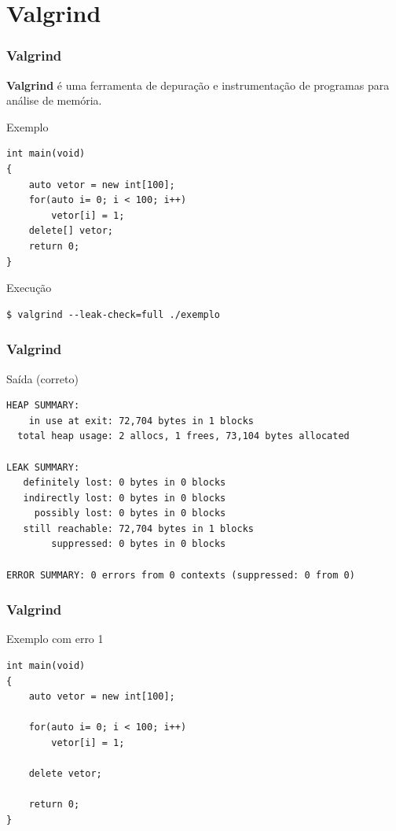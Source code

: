\documentclass[xcolor={usenames,dvipsnames},12pt,presentation,aspectratio=169]{beamer}
\begin{document}
\section{Valgrind}
\begin{frame}[fragile]
  \frametitle{Valgrind}
  \textbf{Valgrind} é uma ferramenta de depuração e instrumentação
  de programas para análise de memória.
  \begin{block}{Exemplo}
\begin{lstlisting}
int main(void)
{
    auto vetor = new int[100];
    for(auto i= 0; i < 100; i++)
        vetor[i] = 1;
    delete[] vetor;
    return 0;
}
\end{lstlisting}
\end{block}
%
  \begin{alertblock}{Execução}
\begin{lstlisting}
$ valgrind --leak-check=full ./exemplo
\end{lstlisting}
\end{alertblock}
\end{frame}
\begin{frame}[fragile]
  \frametitle{Valgrind}
  \begin{block}{Saída (correto)}
\begin{lstlisting}
HEAP SUMMARY:
    in use at exit: 72,704 bytes in 1 blocks
  total heap usage: 2 allocs, 1 frees, 73,104 bytes allocated

LEAK SUMMARY:
   definitely lost: 0 bytes in 0 blocks
   indirectly lost: 0 bytes in 0 blocks
     possibly lost: 0 bytes in 0 blocks
   still reachable: 72,704 bytes in 1 blocks
        suppressed: 0 bytes in 0 blocks

ERROR SUMMARY: 0 errors from 0 contexts (suppressed: 0 from 0)
\end{lstlisting}
\end{block}
\end{frame}
\begin{frame}[fragile]
  \frametitle{Valgrind}
  \begin{block}{Exemplo com erro 1}
\begin{lstlisting}
int main(void)
{
    auto vetor = new int[100];

    for(auto i= 0; i < 100; i++)
        vetor[i] = 1;

    delete vetor;

    return 0;
}
\end{lstlisting}
\end{block}
\end{frame}
\end{document}
